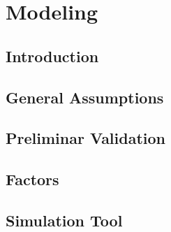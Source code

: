 \section{Modeling}
\subsection{Introduction}
\subsection{General Assumptions}
\subsection{Preliminar Validation}
\subsection{Factors}
\subsection{Simulation Tool}
